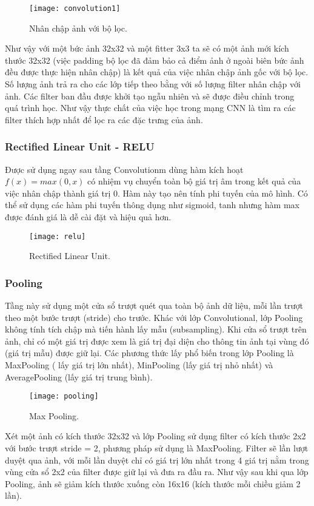 \documentclass[13pt, a4paper]{extreport}
\begin{document}
\begin{figure}[H]
  \centering
    \texttt{[image: convolution1]}
   \caption{\large Nhân chập ảnh với bộ lọc.}
\end{figure}

\indent Như vậy với một bức ảnh 32x32 và một fitter 3x3 ta sẽ có một ảnh mới kích thước 32x32 (việc padding bộ lọc đã đảm bảo cả điểm ảnh ở ngoài biên bức ảnh đều được thực hiện nhân chập) là kết quả của việc nhân chập ảnh gốc với bộ lọc. Số lượng ảnh trả ra cho các lớp tiếp theo bằng với số lượng filter nhân chập với ảnh. Các filter ban đầu được khởi tạo ngẫu nhiên và sẽ được điều chỉnh trong quá trình học. Như vậy thực chất của việc học trong mạng CNN là tìm ra các filter thích hợp nhất để lọc ra các đặc trưng của ảnh.
\subsubsection{Rectified Linear Unit - RELU}
\indent Được sử dụng ngay sau tầng Convolutionm dùng hàm kích hoạt $f(x) = max(0, x)$ có nhiệm vụ chuyển toàn bộ giá trị âm trong kết quả của việc nhân chập thành giá trị 0. Hàm này tạo nên tính phi tuyến của mô hình. Có thể sử dụng các hàm phi tuyến thông dụng như sigmoid, tanh nhưng hàm max được đánh giá là dễ cài đặt và hiệu quả hơn.
\begin{figure}[H]
  \centering
    \texttt{[image: relu]}
   \caption{\large Rectified Linear Unit.}
\end{figure}
\subsubsection{Pooling}
\indent Tầng này sử dụng một cửa sổ trượt quét qua toàn bộ ảnh dữ liệu, mỗi lần trượt theo một bước trượt (stride) cho trước. Khác với lớp Convolutional, lớp Pooling không tính tích chập mà tiến hành lấy mẫu (subsampling). Khi cửa sổ trượt trên ảnh, chỉ có một giá trị được xem là giá trị đại diện cho thông tin ảnh tại vùng đó (giá trị mẫu) được giữ lại. Các phương thức lấy phổ biến trong lớp Pooling là MaxPooling ( lấy giá trị lớn nhất), MinPooling (lấy giá trị nhỏ nhất) và AveragePooling (lấy giá trị trung bình).
\begin{figure}[H]
  \centering
    \texttt{[image: pooling]}
   \caption{\large Max Pooling.}
\end{figure}

\indent Xét một ảnh có kích thước 32x32 và lớp Pooling sử dụng filter có kích thước 2x2 với bước trượt stride = 2, phương pháp sử dụng là MaxPooling. Filter sẽ lần lượt duyệt qua ảnh, với mỗi lần duyệt chỉ có giá trị lớn nhất trong 4 giá trị nằm trong vùng cửa sổ 2x2 của filter được giữ lại và đưa ra đầu ra. Như vậy sau khi qua lớp Pooling, ảnh sẽ giảm kích thước xuống còn 16x16 (kích thước mỗi chiều giảm 2 lần).
\end{document}
